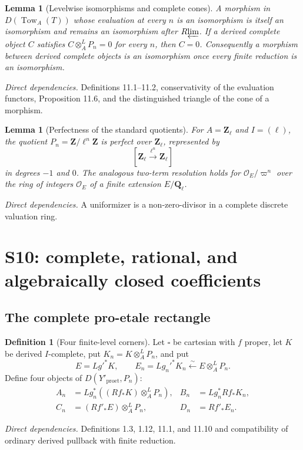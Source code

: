 \documentclass[10pt]{article}
\newtheorem{lemma}[theorem]{Lemma}
\theoremstyle{definition}
\newtheorem{definition}[theorem]{Definition}
\newcommand{\Rlim}{R\!\varprojlim}
\newcommand{\Zl}{\mathbf Z_\ell}
\newcommand{\Ql}{\mathbf Q_\ell}
\newcommand{\Proet}{\mathrm{proet}}
\newcommand{\deps}[1]{\par\smallskip\textit{Direct dependencies.} #1\par}
\begin{document}
\begin{lemma}[Levelwise isomorphisms and complete cones]
A morphism in $D(\operatorname{Tow}_{A}(T))$ whose evaluation at every
$n$ is an isomorphism is itself an isomorphism and remains an isomorphism
after $\Rlim$.  If a derived complete object $C$ satisfies
$C\otimes_A^LP_n=0$ for every $n$, then $C=0$.  Consequently a morphism
between derived complete objects is an isomorphism once every finite
reduction is an isomorphism.
\end{lemma}
\deps{Definitions 11.1--11.2, conservativity of the evaluation functors,
Proposition 11.6, and the distinguished triangle of the cone of a
morphism.}

\begin{lemma}[Perfectness of the standard quotients]
For $A=\Zl$ and $I=(\ell)$, the quotient
$P_n=\mathbf Z/\ell^n\mathbf Z$ is perfect over $\Zl$, represented by
\[
 [\Zl\xrightarrow{\ell^n}\Zl]
\]
in degrees $-1$ and $0$.  The analogous two-term resolution holds for
$\mathcal O_E/\varpi^n$ over the ring of integers $\mathcal O_E$ of a
finite extension $E/\Ql$.
\end{lemma}
\deps{A uniformizer is a non-zero-divisor in a complete discrete valuation
ring.}

\section{S10: complete, rational, and algebraically closed coefficients}

\subsection{The complete pro-etale rectangle}

\begin{definition}[Four finite-level corners]
Let $\square$ be cartesian with $f$ proper, let $K$ be derived
$I$-complete, put $K_n=K\otimes_A^LP_n$, and put
\[
 E=Lg'^*K,
 \qquad E_n=Lg_n'^*K_n
       \xleftarrow{\sim}E\otimes_A^LP_n.
\]
Define four objects of $D(Y'_{\Proet},P_n)$:
\[
\begin{aligned}
 A_n&=Lg_n^*((Rf_*K)\otimes_A^LP_n),&
 B_n&=Lg_n^*Rf_*K_n,\\
 C_n&=(Rf'_*E)\otimes_A^LP_n,&
 D_n&=Rf'_*E_n.
\end{aligned}
\]
\end{definition}
\deps{Definitions 1.3, 1.12, 11.1, and 11.10 and compatibility of ordinary
derived pullback with finite reduction.}
\end{document}
